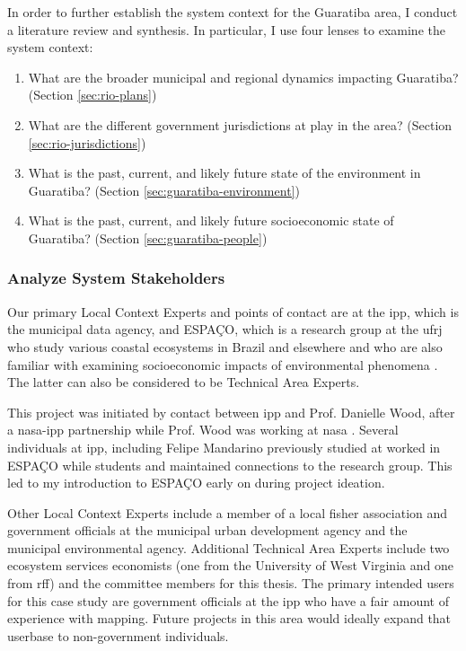 In order to further establish the system context for the Guaratiba area, I conduct a literature review and synthesis. In particular, I use four lenses to examine the system context:

\begin{enumerate} \setlength{\itemsep}{0pt} \setlength{\parskip}{0pt}
    \item What are the broader municipal and regional dynamics impacting Guaratiba? (Section \ref{sec:rio-plans})
    \item What are the different government jurisdictions at play in the area? (Section \ref{sec:rio-jurisdictions})
    \item What is the past, current, and likely future state of the environment in Guaratiba? (Section \ref{sec:guaratiba-environment})
    \item What is the past, current, and likely future socioeconomic state of Guaratiba? (Section \ref{sec:guaratiba-people})
\end{enumerate}

\subsubsection{Analyze System Stakeholders}

Our primary Local Context Experts and points of contact are at the \acf{ipp}, which is the municipal data agency, and ESPAÇO, which is a research group at the \acf{ufrj} who study various coastal ecosystems in Brazil and elsewhere \cite{cruzClassificacaoOrientadaObjetos2007, seabraMapeamentoDinamicaCobertura2013} and who are also familiar with examining socioeconomic impacts of environmental phenomena \cite{schwenkResearchEnvironmentalSocioeconomical2008}. The latter can also be considered to be Technical Area Experts.

This project was initiated by contact between \ac{ipp} and Prof. Danielle Wood, after a \ac{nasa}-\ac{ipp} partnership while Prof. Wood was working at \ac{nasa} \cite{mandarinoNASARioJaneiroPartnership2018}. Several individuals at \ac{ipp}, including Felipe Mandarino previously studied at worked in ESPAÇO while students and maintained connections to the research group. This led to my introduction to ESPAÇO early on during project ideation.

Other Local Context Experts include a member of a local fisher association and government officials at the municipal urban development agency and the municipal environmental agency. Additional Technical Area Experts include two ecosystem services economists (one from the University of West Virginia and one from \ac{rff}) and the committee members for this thesis. The primary intended users for this case study are government officials at the \ac{ipp} who have a fair amount of experience with mapping. Future projects in this area would ideally expand that userbase to non-government individuals. 

